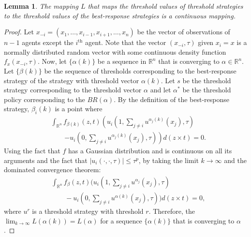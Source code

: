 \documentclass{nature}
\newtheorem{lemma}{Lemma}
\def\R{\mathbb{R}}    %
\begin{document}
\begin{lemma}
The mapping $L$ that maps the threshold values of threshold strategies to the threshold values of the best-response strategies is a continuous mapping. 
\end{lemma}

\begin{proof}
Let $x_{-i}=(x_1,\ldots,x_{i-1},x_{i+1},\ldots,x_n)$ be the vector of observations of $n-1$ agents except the $i^{\text{th}}$ agent. Note that the vector $(x_{-i},\tau)$ given $x_i=x$ is a normally distributed random vector with some continuous density function $f_{x}(x_{-i},\tau)$. Now, let $\{\alpha(k)\}$ be a sequence in $\R^n$ that is converging to $\alpha\in\R^n$. Let $\{\beta(k)\}$ be the sequence of thresholds corresponding to the best-response strategy of the strategy with threshold vector $\alpha(k)$. Let $s$ be the threshold strategy corresponding to the threshold vector $\alpha$ and let $\alpha^*$ be the threshold policy corresponding to the $BR(\alpha)$. By the definition of the best-response strategy, $\beta_i(k)$ is a point where 
\begin{align*}
&\int_{\R^{n}}f_{\beta(k)}(z,t)\left(u_i(1,\sum_{j\not=i}u^{\alpha_j(k)}(x_j),\tau)\right.\\
&\qquad\left.-u_i(0,\sum_{j\not=i}u^{\alpha_j(k)}(x_j),\tau)\right)d(z\times t)=0.
\end{align*}
Using the fact that $f$ has a Gaussian distribution and is continuous on all its arguments and the fact that $|u_i(\cdot,\cdot,\tau)|\leq \tau^p$, by taking the limit $k\to\infty$ and the dominated convergence theorem:
\begin{align*}
&\int_{\R^{n}}f_{\beta}(z,t)(u_i(1,\sum_{j\not=i}u^{\alpha_j}(x_j),\tau)\\ 
&\qquad-u_i(0,\sum_{j\not=i}u^{\alpha(k)}(x_j),\tau))d(z\times t)=0,
\end{align*}
where $u^{r}$ is a threshold strategy with threshold $r$. Therefore, the $\lim_{k\to\infty}L(\alpha(k))=L(\alpha)$ for a sequence $\{\alpha(k)\}$ that is converging to $\alpha$.
\end{proof}
\end{document}
